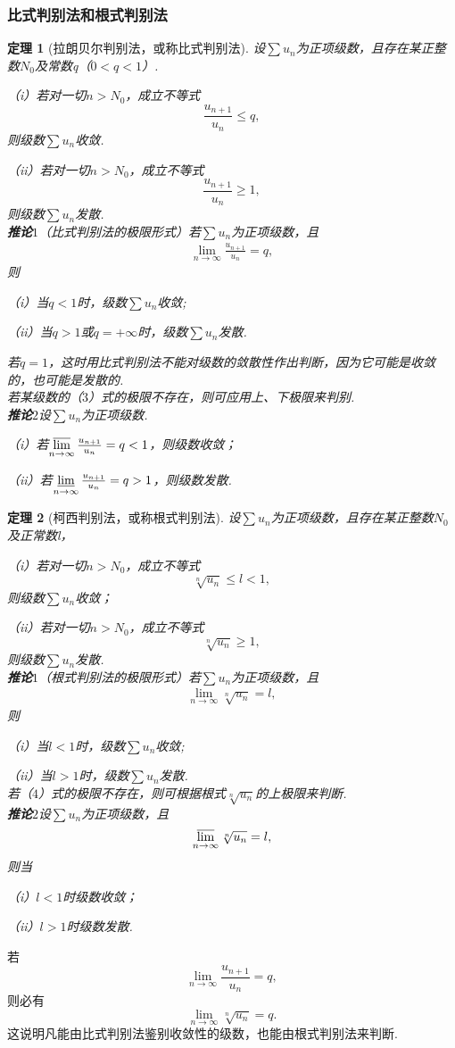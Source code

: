 \documentclass[12pt, UTF8, AutoFakeBold]{ctexart} %
\newtheorem{theorem}{定理}[section]
\newcommand{\limn}{\lim_{n\to\infty}} %
\begin{document}
\subsubsection{比式判别法和根式判别法}
\begin{theorem}[拉朗贝尔判别法，或称比式判别法]
    设$\sum u_n$为正项级数，且存在某正整数$N_0$及常数q（$0<q<1$）.

    （i）若对一切$n>N_0$，成立不等式
    \[
        \frac{u_{n+1}}{u_n} \leq q,
    \]
    则级数$\sum u_n$收敛.

    （ii）若对一切$n>N_0$，成立不等式
    \[
        \frac{u_{n+1}}{u_n} \geq 1,
    \]
    则级数$\sum u_n$发散.\\
    \textbf{推论$1$}（比式判别法的极限形式）若$\sum u_n$为正项级数，且
    \begin{gather}
        \limn\frac{u_{n+1}}{u_n}=q,
    \end{gather}
    则

    （i）当$q<1$时，级数$\sum u_n$收敛;

    （ii）当$q>1$或$q=+\infty$时，级数$\sum u_n$发散.

    若$q=1$，这时用比式判别法不能对级数的敛散性作出判断，因为它可能是收敛的，也可能是发散的.\\
    若某级数的（$3$）式的极限不存在，则可应用上、下极限来判别.\\
    \textbf{推论$2$}设$\sum u_n$为正项级数.

    （i）若$\varlimsup\limits_{n\to\infty}\frac{u_{n+1}}{u_n}=q<1$，则级数收敛；

    （ii）若$\varliminf\limits_{n\to\infty}\frac{u_{n+1}}{u_n}=q>1$，则级数发散.
\end{theorem}
\begin{theorem}[柯西判别法，或称根式判别法]
    设$\sum u_n$为正项级数，且存在某正整数$N_0$及正常数l，

    （i）若对一切$n>N_0$，成立不等式
    \[
        \sqrt[n]{u_n} \leq l<1,
    \]
    则级数$\sum u_n$收敛；

    （ii）若对一切$n>N_0$，成立不等式
    \[
        \sqrt[n]{u_n} \geq 1,
    \]
    则级数$\sum u_n$发散.\\
    \textbf{推论$1$}（根式判别法的极限形式）若$\sum u_n$为正项级数，且
    \begin{gather}
        \limn\sqrt[n]{u_n} = l,
    \end{gather}
    则

    （i）当$l<1$时，级数$\sum u_n$收敛;

    （ii）当$l>1$时，级数$\sum u_n$发散.\\
    若（$4$）式的极限不存在，则可根据根式$\sqrt[n]{u_n}$的上极限来判断.\\
    \textbf{推论$2$}设$\sum u_n$为正项级数，且
    \[
        \varlimsup\limits_{n\to\infty}\sqrt[n]{u_n}=l,
    \]
    则当

    （i）$l<1$时级数收敛；

    （ii）$l>1$时级数发散.
\end{theorem}
若
\[
    \limn\frac{u_{n+1}}{u_n}=q,
\]
则必有
\[
    \limn\sqrt[n]{u_n} = q.
\]
这说明凡能由比式判别法鉴别收敛性的级数，也能由根式判别法来判断.
\end{document}
